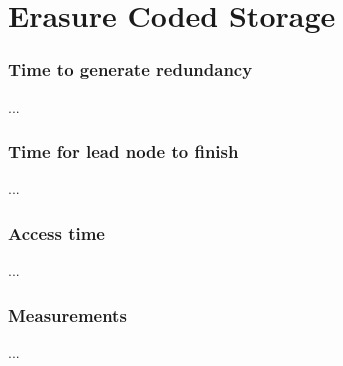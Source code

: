 \section{Erasure Coded Storage}

\subsubsection*{Time to generate redundancy}
...

\subsubsection*{Time for lead node to finish}
...

\subsubsection*{Access time}
...

\subsubsection*{Measurements}
...